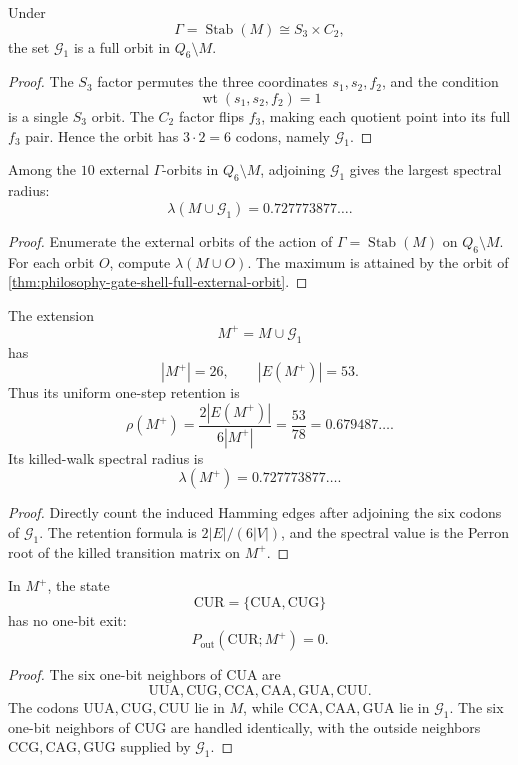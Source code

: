 \begin{theorem}
\label{thm:philosophy-gate-shell-full-external-orbit}
Under
$$
  \Gamma=\operatorname{Stab}(M)\cong S_{3}\times C_{2},
$$
the set $\mathcal G_{1}$ is a full orbit in $Q_{6}\setminus M$.
\end{theorem}
\begin{proof}
The $S_{3}$ factor permutes the three coordinates
$s_{1},s_{2},f_{2}$, and the condition
$$
  \operatorname{wt}(s_{1},s_{2},f_{2})=1
$$
is a single $S_{3}$ orbit. The $C_{2}$ factor flips $f_{3}$, making each
quotient point into its full $f_{3}$ pair. Hence the orbit has
$3\cdot2=6$ codons, namely $\mathcal G_{1}$.
\end{proof}

\begin{theorem}
\label{thm:philosophy-best-symmetric-post-median-orbit}
Among the $10$ external $\Gamma$-orbits in $Q_{6}\setminus M$, adjoining
$\mathcal G_{1}$ gives the largest spectral radius:
$$
  \lambda(M\cup\mathcal G_{1})
  =
  0.727773877\ldots.
$$
\end{theorem}
\begin{proof}
Enumerate the external orbits of the action of
$\Gamma=\operatorname{Stab}(M)$ on $Q_{6}\setminus M$. For each orbit
$O$, compute $\lambda(M\cup O)$. The maximum is attained by the orbit
of \autoref{thm:philosophy-gate-shell-full-external-orbit}.
\end{proof}

\begin{theorem}
\label{thm:philosophy-post-median-shell-geometry}
The extension
$$
  M^{+}=M\cup\mathcal G_{1}
$$
has
$$
  |M^{+}|=26,\qquad |E(M^{+})|=53.
$$
Thus its uniform one-step retention is
$$
  \rho(M^{+})
  =
  \frac{2|E(M^{+})|}{6|M^{+}|}
  =
  \frac{53}{78}
  =
  0.679487\ldots.
$$
Its killed-walk spectral radius is
$$
  \lambda(M^{+})=0.727773877\ldots.
$$
\end{theorem}
\begin{proof}
Directly count the induced Hamming edges after adjoining the six codons
of $\mathcal G_{1}$. The retention formula is
$2|E|/(6|V|)$, and the spectral value is the Perron root of the killed
transition matrix on $M^{+}$.
\end{proof}

\begin{theorem}
\label{thm:philosophy-cur-exit-closure}
In $M^{+}$, the state
$$
  \mathrm{CUR}=\{\mathrm{CUA},\mathrm{CUG}\}
$$
has no one-bit exit:
$$
  P_{\mathrm{out}}(\mathrm{CUR};M^{+})=0.
$$
\end{theorem}
\begin{proof}
The six one-bit neighbors of $\mathrm{CUA}$ are
$$
  \mathrm{UUA},\mathrm{CUG},\mathrm{CCA},
  \mathrm{CAA},\mathrm{GUA},\mathrm{CUU}.
$$
The codons $\mathrm{UUA},\mathrm{CUG},\mathrm{CUU}$ lie in $M$, while
$\mathrm{CCA},\mathrm{CAA},\mathrm{GUA}$ lie in $\mathcal G_{1}$. The
six one-bit neighbors of $\mathrm{CUG}$ are handled identically, with
the outside neighbors $\mathrm{CCG},\mathrm{CAG},\mathrm{GUG}$ supplied
by $\mathcal G_{1}$.
\end{proof}

